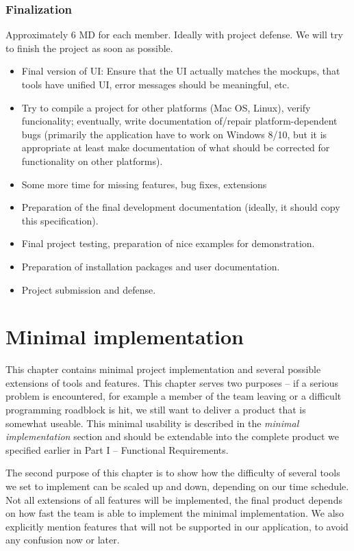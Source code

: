 \subsection{Finalization}

Approximately 6 MD for each member. Ideally with project defense. We will try to finish the project as soon as possible.

\begin{itemize}
\item Final version of UI: Ensure that the UI actually matches the mockups, that tools have unified UI, error messages should be meaningful, etc. 
\item Try to compile a project for other platforms (Mac OS, Linux), verify funcionality; eventually, write documentation of/repair platform-dependent bugs (primarily the application have to work on Windows 8/10, but it is appropriate at least make documentation of what should be corrected for functionality on other platforms).
\item Some more time for missing features, bug fixes, extensions
\item Preparation of the final development documentation (ideally, it should copy this specification).
\item Final project testing, preparation of nice examples for demonstration.
\item Preparation of installation packages and user documentation.
\item Project submission and defense.
\end{itemize}


\chapter{Minimal implementation}

This chapter contains minimal project implementation and several possible extensions of tools and features. This chapter serves two purposes -- if a serious problem is encountered, for example a member of the team leaving or a difficult programming roadblock is hit, we still want to deliver a product that is somewhat useable. This minimal usability is described in the \textit{minimal implementation} section and should be extendable into the complete product we specified earlier in Part I -- Functional Requirements.

The second purpose of this chapter is to show how the difficulty of several tools we set to implement can be scaled up and down, depending on our time schedule. Not all extensions of all features will be implemented, the final product depends on how fast the team is able to implement the minimal implementation. We also explicitly mention features that will not be supported in our application, to avoid any confusion now or later.

